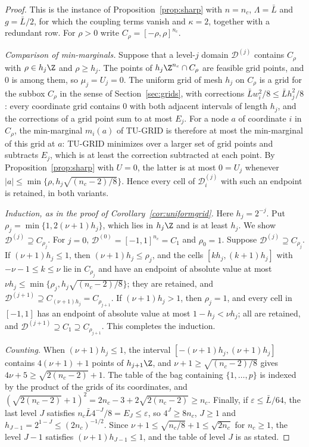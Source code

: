 \begin{proof}
This is the instance of Proposition~\ref{prop:sharp} with $n=n_c$,
$\Lambda=\bar L$ and $g=\bar L/2$, for which the coupling terms vanish and
$\kappa=2$, together with a redundant row. For $\rho>0$ write
$C_\rho=[-\rho,\rho]^{n_c}$.

\emph{Comparison of min-marginals.} Suppose that a level-$j$ domain
$\mathcal D^{(j)}$ contains $C_\rho$ with $\rho\in h_j\Z$ and $\rho\ge h_j$. The
points of $h_j\Z^{n_c}\cap C_\rho$ are feasible grid points, and $0$ is among
them, so $\mu_j=U_j=0$. The uniform grid of mesh $h_j$ on $C_\rho$ is a
grid for the subbox $C_\rho$ in the sense of Section~\ref{sec:grids}, with
corrections $\bar Lw_i^2/8\le\bar Lh_j^2/8$: every coordinate grid contains
$0$ with both adjacent intervals of length $h_j$, and the corrections of a
grid point sum to at most $E_j$. For a node $a$ of coordinate $i$ in
$C_\rho$, the min-marginal $m_i(a)$ of TU-GRID is therefore at most the
min-marginal of this grid at $a$: TU-GRID minimizes over a larger set of
grid points and subtracts $E_j$, which is at least the correction subtracted
at each point.
By Proposition~\ref{prop:sharp} with $U=0$, the latter is at most $0=U_j$
whenever $\lvert a\rvert\le\min\{\rho,h_j\sqrt{(n_c-2)/8}\}$. Hence every cell
of $\mathcal D^{(j)}_i$ with such an endpoint is retained, in both variants.

\emph{Induction, as in the proof of Corollary~\ref{cor:uniformgrid}.} Here
$h_j=2^{-j}$. Put $\rho_j=\min\{1,2(\nu+1)h_j\}$, which lies in $h_j\Z$ and is at
least $h_j$. We show $\mathcal D^{(j)}\supseteq C_{\rho_j}$. For $j=0$,
$\mathcal D^{(0)}=[-1,1]^{n_c}=C_1$ and $\rho_0=1$. Suppose
$\mathcal D^{(j)}\supseteq C_{\rho_j}$. If $(\nu+1)h_j\le1$, then
$(\nu+1)h_j\le\rho_j$, and the cells $[kh_j,(k+1)h_j]$ with $-\nu-1\le k\le \nu$ lie in
$C_{\rho_j}$ and have an endpoint of absolute value at most
$\nu h_j\le\min\{\rho_j,h_j\sqrt{(n_c-2)/8}\}$; they are retained, and
$\mathcal D^{(j+1)}\supseteq C_{(\nu+1)h_j}=C_{\rho_{j+1}}$. If $(\nu+1)h_j>1$, then
$\rho_j=1$, and every cell in $[-1,1]$ has an endpoint of absolute value at
most $1-h_j<\nu h_j$; all are retained, and
$\mathcal D^{(j+1)}\supseteq C_1\supseteq C_{\rho_{j+1}}$. This completes the
induction.

\emph{Counting.} When $(\nu+1)h_j\le1$, the interval $[-(\nu+1)h_j,(\nu+1)h_j]$
contains $4(\nu+1)+1$ points of $h_{j+1}\Z$, and $\nu+1\ge\sqrt{(n_c-2)/8}$ gives
$4\nu+5\ge\sqrt{2(n_c-2)}+1$. The table of the bag containing $\{1,\dots,p\}$ is
indexed by the product of the grids of its coordinates, and
$(\sqrt{2(n_c-2)}+1)^2=2n_c-3+2\sqrt{2(n_c-2)}\ge n_c$. Finally, if
$\varepsilon\le\bar L/64$, the last level $J$ satisfies
$n_c\bar L4^{-J}/8=E_J\le\varepsilon$, so $4^J\ge8n_c$, $J\ge1$ and
$h_{J-1}=2^{1-J}\le(2n_c)^{-1/2}$. Since
$\nu+1\le\sqrt{n_c/8}+1\le\sqrt{2n_c}$ for $n_c\ge1$, the level $J-1$ satisfies
$(\nu+1)h_{J-1}\le1$, and the table of level $J$ is as stated.
\end{proof}

